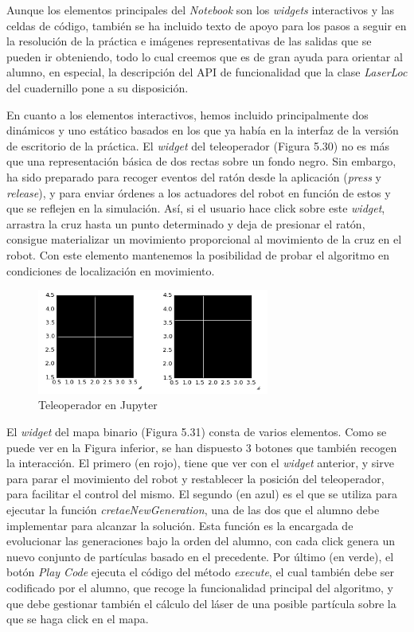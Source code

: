 Aunque los elementos principales del \textit{Notebook} son los \textit{widgets} interactivos y las celdas de código, también se ha incluido texto de apoyo para los pasos a seguir en la resolución de la práctica e imágenes representativas de las salidas que se pueden ir obteniendo, todo lo cual creemos que es de gran ayuda para orientar al alumno, en especial, la descripción del API de funcionalidad que la clase \textit{LaserLoc} del cuadernillo pone a su disposición.

En cuanto a los elementos interactivos, hemos incluido principalmente dos dinámicos y uno estático basados en los que ya había en la interfaz de la versión de escritorio de la práctica. El \textit{widget} del teleoperador (Figura 5.30) no es más que una representación básica de dos rectas sobre un fondo negro. Sin embargo, ha sido preparado para recoger eventos del ratón desde la aplicación (\textit{press} y \textit{release}), y para enviar órdenes a los actuadores del robot en función de estos y que se reflejen en la simulación. Así, si el usuario hace click sobre este \textit{widget}, arrastra la cruz hasta un punto determinado y deja de presionar el ratón, consigue materializar un movimiento proporcional al movimiento de la cruz en el robot. Con este elemento mantenemos la posibilidad de probar el algoritmo en condiciones de localización en movimiento. 

\begin{figure}[H]
	\begin{center}
		\includegraphics[width=0.68\textwidth]{figures/teleoperadorjupyter.png}
		\caption{Teleoperador en Jupyter}
		\label{fig.laserlocjupyter}
		\end{center}
\end{figure}


El \textit{widget} del mapa binario (Figura 5.31) consta de varios elementos. Como se puede ver en la Figura inferior, se han dispuesto 3 botones que también recogen la interacción. El primero (en rojo), tiene que ver con el \textit{widget} anterior, y sirve para parar el movimiento del robot y restablecer la posición del teleoperador, para facilitar el control del mismo. El segundo (en azul) es el que se utiliza para ejecutar la función \textit{cretaeNewGeneration}, una de las dos que el alumno debe implementar para alcanzar la solución. Esta función es la encargada de evolucionar las generaciones bajo la orden del alumno, con cada click genera un nuevo conjunto de partículas basado en el precedente. Por último (en verde), el botón \textit{Play Code} ejecuta el código del método \textit{execute}, el cual también debe ser codificado por el alumno, que recoge la funcionalidad principal del algoritmo, y que debe gestionar también el cálculo del láser de una posible partícula sobre la que se haga click en el mapa.

